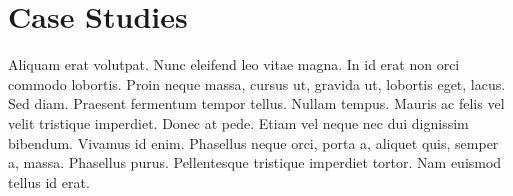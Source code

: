 \section{Case Studies}
\label{sec:casestudies}

Aliquam erat volutpat. Nunc eleifend leo vitae magna. In id erat non orci
commodo lobortis. Proin neque massa, cursus ut, gravida ut, lobortis eget,
lacus. Sed diam. Praesent fermentum tempor tellus. Nullam tempus. Mauris ac
felis vel velit tristique imperdiet. Donec at pede. Etiam vel neque nec dui
dignissim bibendum. Vivamus id enim. Phasellus neque orci, porta a, aliquet
quis, semper a, massa. Phasellus purus. Pellentesque tristique imperdiet tortor.
Nam euismod tellus id erat.

